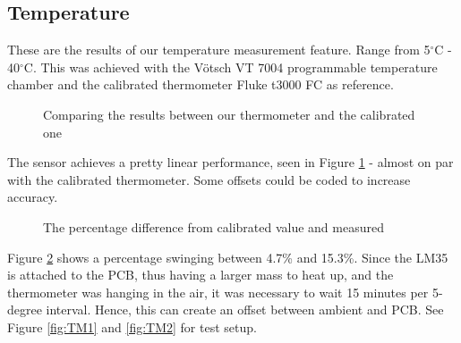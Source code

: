 \subsection{Temperature}
\label{sec:results_temperature}
These are the results of our temperature measurement feature. Range from 5$^\circ$C - 40$^\circ$C. This was achieved with the Vötsch VT 7004 programmable temperature chamber and the calibrated thermometer Fluke t3000 FC as reference.

\begin{figure}[hbt!]
    \centering


    \caption{Comparing the results between our thermometer and the calibrated one}
    \label{fig:tempGraph}
    
\end{figure}

\noindent The sensor achieves a pretty linear performance, seen in Figure \ref{fig:tempGraph} - almost on par with the calibrated thermometer. Some offsets could be coded to increase accuracy.

\begin{figure}[h]
    \centering


    \caption{The percentage difference from calibrated value and measured}
    \label{fig:tempGraphDiff}
    
\end{figure}

\noindent Figure \ref{fig:tempGraphDiff} shows a percentage swinging between 4.7\% and 15.3\%. Since the LM35 is attached to the PCB, thus having a larger mass to heat up, and the thermometer was hanging in the air, it was necessary to wait 15 minutes per 5-degree interval. Hence, this can create an offset between ambient and PCB. See Figure \ref{fig:TM1} and \ref{fig:TM2} for test setup.